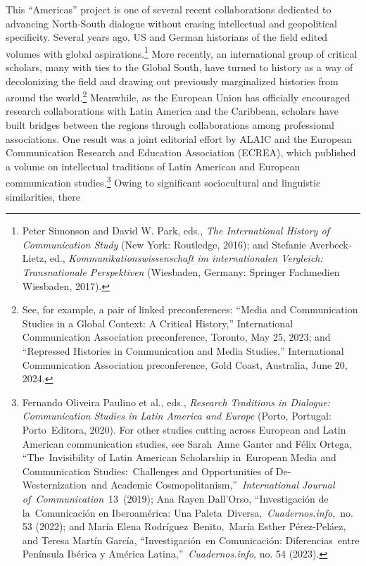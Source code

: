 \documentclass{tufte-handout}
\begin{document}
This ``Americas'' project is one of several recent collaborations
dedicated to advancing North-South dialogue without erasing intellectual
and geopolitical specificity. Several years ago, US and German
historians of the field edited volumes with global
aspirations.\footnote{Peter Simonson and David W. Park, eds., \emph{The
  International History of Communication Study} (New York: Routledge,
  2016); and Stefanie Averbeck-Lietz, ed.,
  \emph{Kommunikationswissenschaft im internationalen Vergleich:
  Transnationale Perspektiven} (Wiesbaden, Germany: Springer Fachmedien
  Wiesbaden, 2017).} More recently, an international group of critical
scholars, many with ties to the Global South, have turned to history as
a way of decolonizing the field and drawing out previously marginalized
histories from around the world.\footnote{See, for example, a pair of
  linked preconferences: ``Media and Communication Studies in a Global
  Context: A Critical History,'' International Communication Association
  preconference, Toronto, May 25, 2023; and ``Repressed Histories in
  Communication and Media Studies,'' International Communication
  Association preconference, Gold Coast, Australia, June 20, 2024.}
Meanwhile, as the European Union has officially encouraged research
collaborations with Latin America and the Caribbean, scholars have built
bridges between the regions through collaborations among professional
associations. One result was a joint editorial effort by ALAIC and the
European Communication Research and Education Association (ECREA), which
published a volume on intellectual traditions of Latin American and
European communication studies.\footnote{Fernando Oliveira Paulino et
  al., eds., \emph{Research Traditions in Dialogue: Communication
  Studies in Latin America and Europe} (Porto, Portugal: Porto~Editora,
  2020). For other studies cutting across European and Latin American
  communication studies, see Sarah~Anne Ganter and Félix Ortega,
  ``The~Invisibility of Latin American Scholarship in~European Media and
  Communication Studies:~Challenges and Opportunities of
  De-Westernization~and Academic Cosmopolitanism,''~\emph{International
  Journal of~Communication}~13~(2019); Ana Rayen Dall'Orso,
  ``Investigación de la~Comunicación en Iberoamérica: Una
  Paleta~Diversa,~\emph{Cuadernos.info},\emph{~}no. 53 (2022); and María
  Elena Rodríguez~Benito,~María Esther Pérez-Peláez, and Teresa Martín
  García, ``Investigación~en Comunicación: Diferencias~entre Península
  Ibérica y América Latina,''~\emph{Cuadernos.info}, no. 54 (2023).} 
Owing to significant sociocultural and linguistic similarities, there
\end{document}
